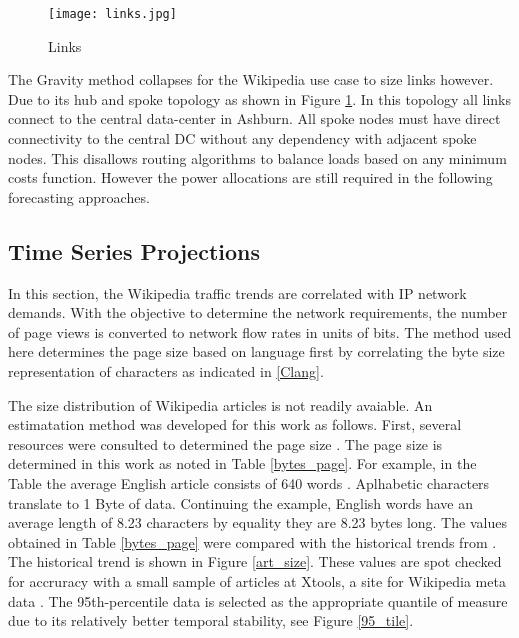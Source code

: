 \documentclass[conference]{IEEEtran}
\begin{document}
\begin{figure}[htbp]
\centering
\texttt{[image: links.jpg]}
\caption{Links}
\label{links}
\end{figure}

The Gravity method collapses for the Wikipedia use case to size links however. Due to its hub and spoke topology as shown in Figure \ref{links}. In this topology all links connect to the central data-center in Ashburn. All spoke nodes must have direct connectivity to the central DC without any dependency with adjacent spoke nodes. This disallows routing algorithms to balance loads based on any minimum costs function. However the power allocations are still required in the following forecasting approaches.

\subsection{Time Series Projections}
In this section, the Wikipedia traffic trends are correlated with IP network demands. With the objective to determine the network requirements, the number of page views is converted to network flow rates in units of bits. The method used here determines the page size based on language first by correlating the byte size representation of characters as indicated in \ref{Clang}. 

The size distribution of Wikipedia articles is not readily avaiable. An estimatation method was developed for this work as follows. First, several resources were consulted to determined the page size \cite{wiki_avg_article, wiki_stats,xtools}. The page size is determined in this work as noted in Table \ref{bytes_page}. For example, in the Table the average English article consists of 640 words \cite{wiki_avg_article}. Aplhabetic characters translate to 1 Byte of data. Continuing the example, English words have an average length of 8.23 characters by equality they are 8.23 bytes long. The values obtained in Table \ref{bytes_page} were compared with the historical trends from \cite{wiki_stats}. The historical trend is shown in Figure \ref{art_size}. These values are spot checked for accruracy with a small sample of articles at Xtools, a site for Wikipedia meta data \cite{xtools}. The 95th-percentile data is selected as the appropriate quantile of measure due to its relatively better temporal stability, see Figure \ref{95_tile}.
\end{document}
